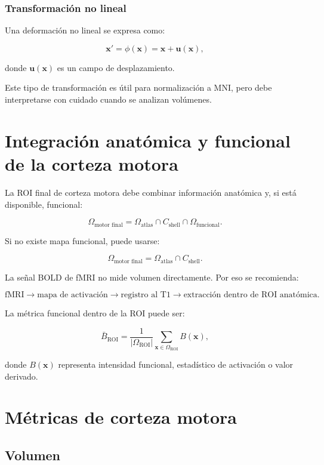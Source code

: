 \documentclass[12pt,a4paper]{article}
\begin{document}
\subsubsection{Transformación no lineal}

Una deformación no lineal se expresa como:

\[
\mathbf{x}' = \phi(\mathbf{x}) = \mathbf{x}+\mathbf{u}(\mathbf{x}),
\]

donde \(\mathbf{u}(\mathbf{x})\) es un campo de desplazamiento.

Este tipo de transformación es útil para normalización a MNI, pero debe interpretarse con cuidado cuando se analizan volúmenes.

\section{Integración anatómica y funcional de la corteza motora}

La ROI final de corteza motora debe combinar información anatómica y, si está disponible, funcional:

\[
\Omega_{\text{motor final}}
=
\Omega_{\text{atlas}}
\cap
C_{\text{shell}}
\cap
\Omega_{\text{funcional}}.
\]

Si no existe mapa funcional, puede usarse:

\[
\Omega_{\text{motor final}}
=
\Omega_{\text{atlas}}
\cap
C_{\text{shell}}.
\]

La señal BOLD de fMRI no mide volumen directamente. Por eso se recomienda:

\[
\text{fMRI}
\rightarrow
\text{mapa de activación}
\rightarrow
\text{registro al T1}
\rightarrow
\text{extracción dentro de ROI anatómica}.
\]

La métrica funcional dentro de la ROI puede ser:

\[
\bar{B}_{\text{ROI}}
=
\frac{1}{|\Omega_{\text{ROI}}|}
\sum_{\mathbf{x}\in\Omega_{\text{ROI}}}
B(\mathbf{x}),
\]

donde \(B(\mathbf{x})\) representa intensidad funcional, estadístico de activación o valor derivado.

\section{Métricas de corteza motora}

\subsection{Volumen}
\end{document}
